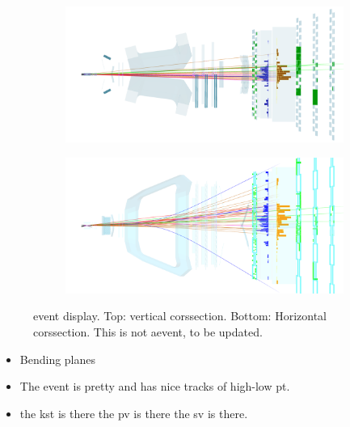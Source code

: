 \begin{figure}[t]
  \centering
  \begin{subfigure}{\textwidth}
    \raggedright
    \includegraphics[width=\textwidth]{Figures/Chapter2/top}
    \caption{}
    \label{det_evt_display_top}
  \end{subfigure}
  \begin{subfigure}{\textwidth}
    \raggedleft
    \includegraphics[width=\textwidth]{Figures/Chapter2/side}
    \caption{}
    \label{det_evt_display_side}
  \end{subfigure}
  \caption{\BsJpsiKst event display. Top: vertical corssection. Bottom: Horizontal corssection.
  {\color{red} This is not a\BsJpsiKst event, to be updated.}}
  \label{det_evt_display}
\end{figure}

\begin{itemize}
  \item Bending planes
  \item The event is pretty and has nice tracks of high-low pt.
  \item the kst is there the pv is there the sv is there.
\end{itemize}
